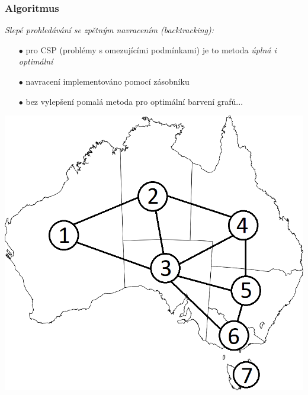\documentclass[10pt,xcolor=pdflatex]{beamer}
\begin{document}
\begin{frame}\frametitle{Algoritmus}
    \emph{Slepé prohledávání se zpětným navracením (backtracking):}
    \begin{itemize}
    \item[$\bullet$] pro CSP (problémy s omezujícími podmínkami) je to metoda \emph{úplná i optimální}
    \item[$\bullet$] navracení implementováno pomocí zásobníku
    \item[$\bullet$] bez vylepšení pomalá metoda pro optimální barvení grafů...
	\end{itemize}
    \includegraphics[scale=0.3]{img/australia.png}

\end{frame}
\end{document}
